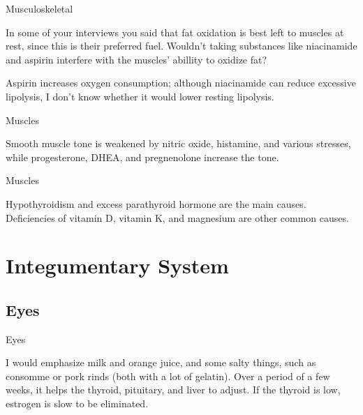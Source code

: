 \documentclass[11pt,oneside,openany,extrafontsizes]{memoir}
\begin{document}
\begin{qaexchange}{Musculoskeletal}

    \begin{question}
        In some of your interviews you said that fat oxidation is best left to muscles at rest, since this is their preferred fuel. Wouldn't taking substances like niacinamide and aspirin interfere with the muscles' abillity to oxidize fat?
    \end{question}

    \begin{answer}
        Aspirin increases oxygen consumption; although niacinamide can reduce excessive lipolysis, I don't know whether it would lower resting lipolysis.
    \end{answer}
\end{qaexchange}

\begin{standalonequote}{Muscles}

    \begin{answer}
       Smooth muscle tone is weakened by nitric oxide, histamine, and various stresses, while progesterone, DHEA, and pregnenolone increase the tone. 
    \end{answer}
\end{standalonequote}

\begin{standalonequote}{Muscles}

    \begin{answer}
      Hypothyroidism and excess parathyroid hormone are the main causes. Deficiencies of vitamin D, vitamin K, and magnesium are other common causes.
    \end{answer}
\end{standalonequote}

\section{Integumentary System}

\subsection{Eyes}

\begin{standalonequote}{Eyes}

    \begin{answer}
        I would emphasize milk and orange juice, and some salty things, such as consomme or pork rinds (both with a lot of gelatin). Over a period of a few weeks, it helps the thyroid, pituitary, and liver to adjust. If the thyroid is low, estrogen is slow to be eliminated.
    \end{answer}
\end{standalonequote}
\end{document}
